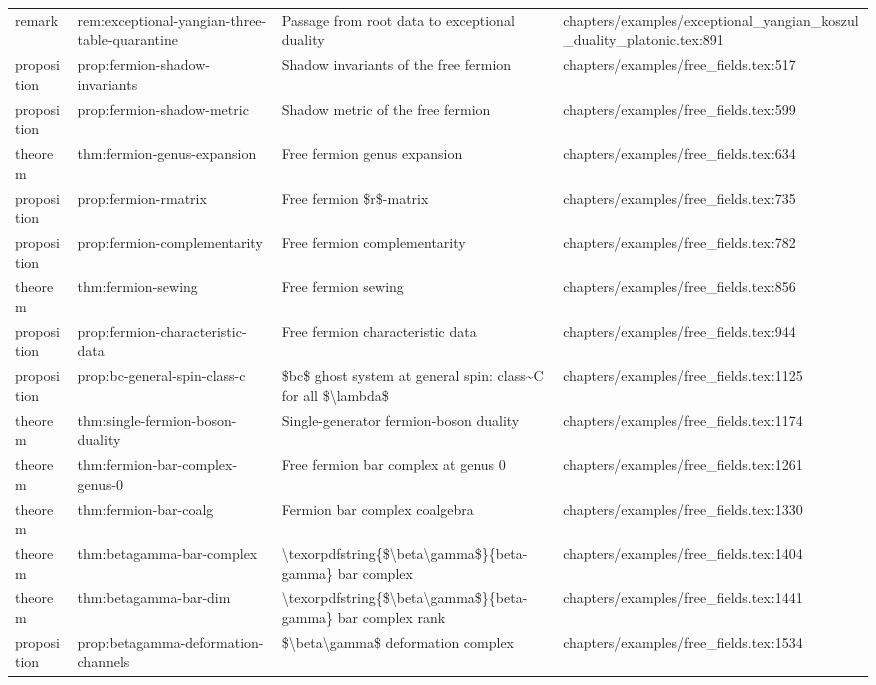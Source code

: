 \documentclass[11pt]{article}
\begin{document}
\begin{longtable}{L{0.10\textwidth}L{0.26\textwidth}L{0.42\textwidth}L{0.22\textwidth}}
remark & rem:exceptional-yangian-three-table-quarantine & Passage from root data to exceptional duality & chapters/examples/exceptional\_yangian\_koszul\_duality\_platonic.tex:891\\
proposition & prop:fermion-shadow-invariants & Shadow invariants of the free fermion & chapters/examples/free\_fields.tex:517\\
proposition & prop:fermion-shadow-metric & Shadow metric of the free fermion & chapters/examples/free\_fields.tex:599\\
theorem & thm:fermion-genus-expansion & Free fermion genus expansion & chapters/examples/free\_fields.tex:634\\
proposition & prop:fermion-rmatrix & Free fermion \$r\$-matrix & chapters/examples/free\_fields.tex:735\\
proposition & prop:fermion-complementarity & Free fermion complementarity & chapters/examples/free\_fields.tex:782\\
theorem & thm:fermion-sewing & Free fermion sewing & chapters/examples/free\_fields.tex:856\\
proposition & prop:fermion-characteristic-data & Free fermion characteristic data & chapters/examples/free\_fields.tex:944\\
proposition & prop:bc-general-spin-class-c & \$bc\$ ghost system at general spin: class\textasciitilde{}C for all \$\textbackslash{}lambda\$ & chapters/examples/free\_fields.tex:1125\\
theorem & thm:single-fermion-boson-duality & Single-generator fermion-boson duality & chapters/examples/free\_fields.tex:1174\\
theorem & thm:fermion-bar-complex-genus-0 & Free fermion bar complex at genus 0 & chapters/examples/free\_fields.tex:1261\\
theorem & thm:fermion-bar-coalg & Fermion bar complex coalgebra & chapters/examples/free\_fields.tex:1330\\
theorem & thm:betagamma-bar-complex & \textbackslash{}texorpdfstring\{\$\textbackslash{}beta\textbackslash{}gamma\$\}\{beta-gamma\} bar complex & chapters/examples/free\_fields.tex:1404\\
theorem & thm:betagamma-bar-dim & \textbackslash{}texorpdfstring\{\$\textbackslash{}beta\textbackslash{}gamma\$\}\{beta-gamma\} bar complex rank & chapters/examples/free\_fields.tex:1441\\
proposition & prop:betagamma-deformation-channels & \$\textbackslash{}beta\textbackslash{}gamma\$ deformation complex & chapters/examples/free\_fields.tex:1534\\

\end{longtable}
\end{document}
